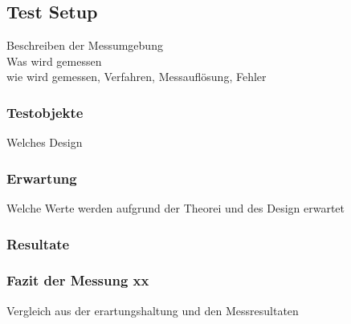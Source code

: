 \subsection{Test Setup}
Beschreiben der Messumgebung\\
Was wird gemessen\\
wie wird gemessen, Verfahren, Messauflösung, Fehler
\subsubsection{Testobjekte}
Welches Design
\subsubsection{Erwartung}
Welche Werte werden aufgrund der Theorei und des Design erwartet
\subsubsection{Resultate}
\subsubsection{Fazit der Messung xx}
Vergleich aus der erartungshaltung und den Messresultaten